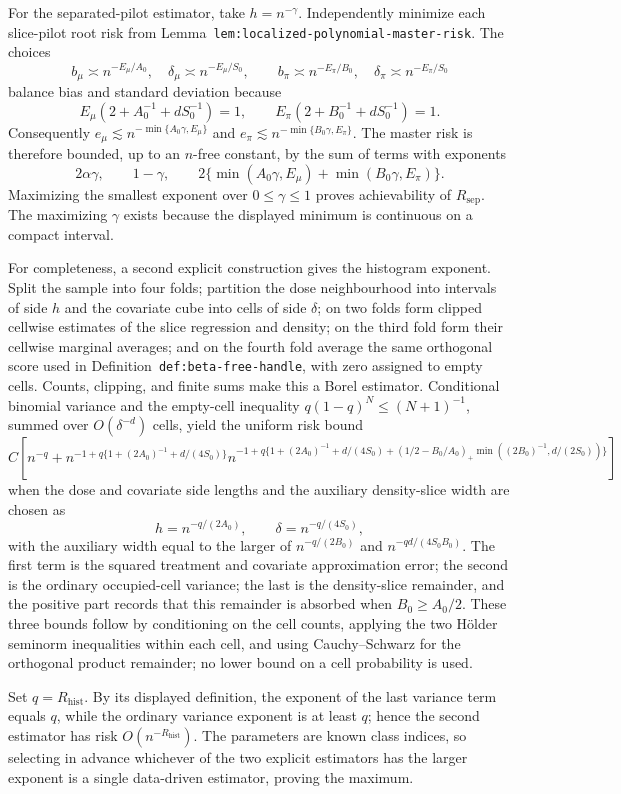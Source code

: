 For the separated-pilot estimator, take \(h=n^{-\gamma}\). Independently minimize each slice-pilot root risk from Lemma~\texttt{lem:localized-polynomial-master-risk}. The choices
\[
b_\mu\asymp n^{-E_\mu/A_0},\quad \delta_\mu\asymp n^{-E_\mu/S_0},
\qquad
b_\pi\asymp n^{-E_\pi/B_0},\quad \delta_\pi\asymp n^{-E_\pi/S_0}
\]
balance bias and standard deviation because
\[
E_\mu\left(2+A_0^{-1}+dS_0^{-1}\right)=1,\qquad E_\pi\left(2+B_0^{-1}+dS_0^{-1}\right)=1.
\]
Consequently \(e_\mu\lesssim n^{-\min\{A_0\gamma,E_\mu\}}\) and \(e_\pi\lesssim n^{-\min\{B_0\gamma,E_\pi\}}\). The master risk is therefore bounded, up to an \(n\)-free constant, by the sum of terms with exponents
\[
2\alpha\gamma,\qquad 1-\gamma,\qquad 2\{\min(A_0\gamma,E_\mu)+\min(B_0\gamma,E_\pi)\}.
\]
Maximizing the smallest exponent over \(0\le\gamma\le1\) proves achievability of \(R_{\mathrm{sep}}\). The maximizing \(\gamma\) exists because the displayed minimum is continuous on a compact interval.

For completeness, a second explicit construction gives the histogram exponent. Split the sample into four folds; partition the dose neighbourhood into intervals of side \(h\) and the covariate cube into cells of side \(\delta\); on two folds form clipped cellwise estimates of the slice regression and density; on the third fold form their cellwise marginal averages; and on the fourth fold average the same orthogonal score used in Definition~\texttt{def:beta-free-handle}, with zero assigned to empty cells. Counts, clipping, and finite sums make this a Borel estimator. Conditional binomial variance and the empty-cell inequality \(q(1-q)^N\le (N+1)^{-1}\), summed over \(O(\delta^{-d})\) cells, yield the uniform risk bound
\[
C\left[n^{-q}+n^{-1+q\{1+(2A_0)^{-1}+d/(4S_0)\}}
n^{-1+q\{1+(2A_0)^{-1}+d/(4S_0)+(1/2-B_0/A_0)_+\min((2B_0)^{-1},d/(2S_0))\}}\right]
\]
when the dose and covariate side lengths and the auxiliary density-slice width are chosen as
\[
h=n^{-q/(2A_0)},\qquad \delta=n^{-q/(4S_0)},
\]
with the auxiliary width equal to the larger of \(n^{-q/(2B_0)}\) and \(n^{-qd/(4S_0B_0)}\). The first term is the squared treatment and covariate approximation error; the second is the ordinary occupied-cell variance; the last is the density-slice remainder, and the positive part records that this remainder is absorbed when \(B_0\ge A_0/2\). These three bounds follow by conditioning on the cell counts, applying the two H\"older seminorm inequalities within each cell, and using Cauchy--Schwarz for the orthogonal product remainder; no lower bound on a cell probability is used.

Set \(q=R_{\mathrm{hist}}\). By its displayed definition, the exponent of the last variance term equals \(q\), while the ordinary variance exponent is at least \(q\); hence the second estimator has risk \(O(n^{-R_{\mathrm{hist}}})\). The parameters are known class indices, so selecting in advance whichever of the two explicit estimators has the larger exponent is a single data-driven estimator, proving the maximum.